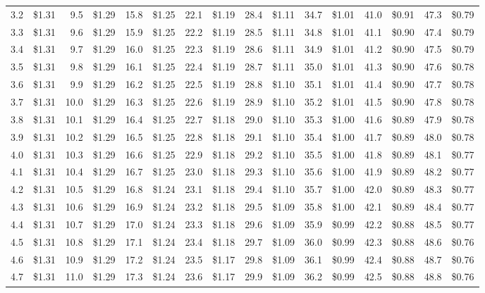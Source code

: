 \documentclass{article}
\begin{document}
\begin{tabular}{|*{8}{rr|}}
3.2 & \$1.31 & 9.5 & \$1.29 & 15.8 & \$1.25 & 22.1 & \$1.19 & 28.4 & \$1.11 & 34.7 & \$1.01 & 41.0 & \$0.91 & 47.3 & \$0.79\\
3.3 & \$1.31 & 9.6 & \$1.29 & 15.9 & \$1.25 & 22.2 & \$1.19 & 28.5 & \$1.11 & 34.8 & \$1.01 & 41.1 & \$0.90 & 47.4 & \$0.79\\
3.4 & \$1.31 & 9.7 & \$1.29 & 16.0 & \$1.25 & 22.3 & \$1.19 & 28.6 & \$1.11 & 34.9 & \$1.01 & 41.2 & \$0.90 & 47.5 & \$0.79\\
3.5 & \$1.31 & 9.8 & \$1.29 & 16.1 & \$1.25 & 22.4 & \$1.19 & 28.7 & \$1.11 & 35.0 & \$1.01 & 41.3 & \$0.90 & 47.6 & \$0.78\\
3.6 & \$1.31 & 9.9 & \$1.29 & 16.2 & \$1.25 & 22.5 & \$1.19 & 28.8 & \$1.10 & 35.1 & \$1.01 & 41.4 & \$0.90 & 47.7 & \$0.78\\
3.7 & \$1.31 & 10.0 & \$1.29 & 16.3 & \$1.25 & 22.6 & \$1.19 & 28.9 & \$1.10 & 35.2 & \$1.01 & 41.5 & \$0.90 & 47.8 & \$0.78\\
3.8 & \$1.31 & 10.1 & \$1.29 & 16.4 & \$1.25 & 22.7 & \$1.18 & 29.0 & \$1.10 & 35.3 & \$1.00 & 41.6 & \$0.89 & 47.9 & \$0.78\\
3.9 & \$1.31 & 10.2 & \$1.29 & 16.5 & \$1.25 & 22.8 & \$1.18 & 29.1 & \$1.10 & 35.4 & \$1.00 & 41.7 & \$0.89 & 48.0 & \$0.78\\
4.0 & \$1.31 & 10.3 & \$1.29 & 16.6 & \$1.25 & 22.9 & \$1.18 & 29.2 & \$1.10 & 35.5 & \$1.00 & 41.8 & \$0.89 & 48.1 & \$0.77\\
4.1 & \$1.31 & 10.4 & \$1.29 & 16.7 & \$1.25 & 23.0 & \$1.18 & 29.3 & \$1.10 & 35.6 & \$1.00 & 41.9 & \$0.89 & 48.2 & \$0.77\\
4.2 & \$1.31 & 10.5 & \$1.29 & 16.8 & \$1.24 & 23.1 & \$1.18 & 29.4 & \$1.10 & 35.7 & \$1.00 & 42.0 & \$0.89 & 48.3 & \$0.77\\
4.3 & \$1.31 & 10.6 & \$1.29 & 16.9 & \$1.24 & 23.2 & \$1.18 & 29.5 & \$1.09 & 35.8 & \$1.00 & 42.1 & \$0.89 & 48.4 & \$0.77\\
4.4 & \$1.31 & 10.7 & \$1.29 & 17.0 & \$1.24 & 23.3 & \$1.18 & 29.6 & \$1.09 & 35.9 & \$0.99 & 42.2 & \$0.88 & 48.5 & \$0.77\\
4.5 & \$1.31 & 10.8 & \$1.29 & 17.1 & \$1.24 & 23.4 & \$1.18 & 29.7 & \$1.09 & 36.0 & \$0.99 & 42.3 & \$0.88 & 48.6 & \$0.76\\
4.6 & \$1.31 & 10.9 & \$1.29 & 17.2 & \$1.24 & 23.5 & \$1.17 & 29.8 & \$1.09 & 36.1 & \$0.99 & 42.4 & \$0.88 & 48.7 & \$0.76\\
4.7 & \$1.31 & 11.0 & \$1.29 & 17.3 & \$1.24 & 23.6 & \$1.17 & 29.9 & \$1.09 & 36.2 & \$0.99 & 42.5 & \$0.88 & 48.8 & \$0.76\\

\end{tabular}
\end{document}
